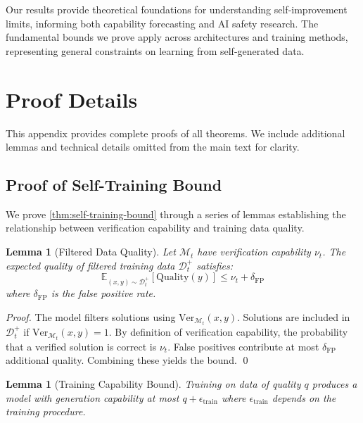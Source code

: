 \documentclass{article}
\newtheorem{lemma}[theorem]{Lemma}
\theoremstyle{definition}
\theoremstyle{remark}
\newcommand{\M}{\mathcal{M}}  %
\newcommand{\D}{\mathcal{D}}  %
\newcommand{\Ver}{\text{Ver}}  %
\newcommand{\E}{\mathbb{E}}    %
\begin{document}
Our results provide theoretical foundations for understanding self-improvement limits, informing both capability forecasting and AI safety research. The fundamental bounds we prove apply across architectures and training methods, representing general constraints on learning from self-generated data.




\appendix

\section{Proof Details}
\label{app:proofs}

This appendix provides complete proofs of all theorems. We include additional lemmas and technical details omitted from the main text for clarity.

\subsection{Proof of Self-Training Bound}
\label{app:proof-st-bound}

We prove \cref{thm:self-training-bound} through a series of lemmas establishing the relationship between verification capability and training data quality.

\begin{lemma}[Filtered Data Quality]
\label{lem:filtered-quality}
Let \(\M_t\) have verification capability \(\nu_t\). The expected quality of filtered training data \(\D_t^+\) satisfies:
\[
\E_{(x,y) \sim \D_t^+}[\text{Quality}(y)] \leq \nu_t + \delta_{\text{FP}}
\]
where \(\delta_{\text{FP}}\) is the false positive rate.
\end{lemma}

\begin{proof}
The model filters solutions using \(\Ver_{\M_t}(x, y)\). Solutions are included in \(\D_t^+\) if \(\Ver_{\M_t}(x,y) = 1\). By definition of verification capability, the probability that a verified solution is correct is \(\nu_t\). False positives contribute at most \(\delta_{\text{FP}}\) additional quality. Combining these yields the bound. \qed
\end{proof}

\begin{lemma}[Training Capability Bound]
\label{lem:training-bound}
Training on data of quality \(q\) produces a model with generation capability at most \(q + \epsilon_{\text{train}}\) where \(\epsilon_{\text{train}}\) depends on the training procedure.
\end{lemma}
\end{document}
